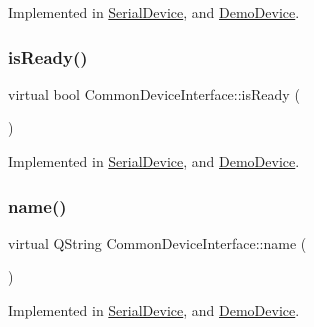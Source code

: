 Implemented in \hyperlink{class_serial_device_a56d7c575161fd216821d06e25f37106c}{Serial\+Device}, and \hyperlink{class_demo_device_a32e89c17f613abfa7f2a4d9f970bbffe}{Demo\+Device}.

\hypertarget{class_common_device_interface_ae58207ead16a77fa94babe01f0a3ba40}{}\label{class_common_device_interface_ae58207ead16a77fa94babe01f0a3ba40} 
\subsubsection{\texorpdfstring{is\+Ready()}{isReady()}}
{\footnotesize\ttfamily virtual bool Common\+Device\+Interface\+::is\+Ready (\begin{DoxyParamCaption}{ }\end{DoxyParamCaption})\hspace{0.3cm}{\ttfamily [pure virtual]}}



Implemented in \hyperlink{class_serial_device_aa2435fb76a612b2ebf1a61287deee85d}{Serial\+Device}, and \hyperlink{class_demo_device_aaadb9ced56699af55526b9fc7cf8420c}{Demo\+Device}.

\hypertarget{class_common_device_interface_a3d80b22eafc88af3109b08491bef6e8a}{}\label{class_common_device_interface_a3d80b22eafc88af3109b08491bef6e8a} 
\subsubsection{\texorpdfstring{name()}{name()}}
{\footnotesize\ttfamily virtual Q\+String Common\+Device\+Interface\+::name (\begin{DoxyParamCaption}{ }\end{DoxyParamCaption})\hspace{0.3cm}{\ttfamily [pure virtual]}}



Implemented in \hyperlink{class_serial_device_a97092ec9379ed561866dad21475ea331}{Serial\+Device}, and \hyperlink{class_demo_device_acde538bd5a71a8d4df6293876169545c}{Demo\+Device}.

\hypertarget{class_common_device_interface_ab9f57b21f72ebfbf79c86f8d0e4f0654}{}\label{class_common_device_interface_ab9f57b21f72ebfbf79c86f8d0e4f0654} 
